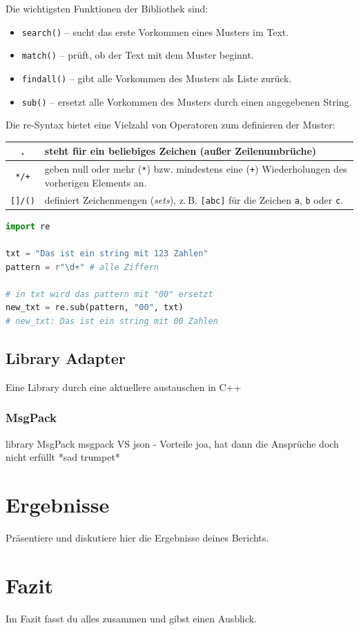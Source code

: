 \documentclass[a4paper, 12pt]{article}
\begin{document}
Die wichtigsten Funktionen der Bibliothek sind:
\begin{itemize}
    \item \texttt{search()} – sucht das erste Vorkommen eines Musters im Text.
    \item \texttt{match()} – prüft, ob der Text mit dem Muster beginnt.
    \item \texttt{findall()} – gibt alle Vorkommen des Musters als Liste zurück.
    \item \texttt{sub()} – ersetzt alle Vorkommen des Musters durch einen angegebenen String.
\end{itemize}

Die re-Syntax bietet eine Vielzahl von Operatoren zum definieren der Muster:
\begin{table}[h!]
\centering
\begin{tabular}{|c | >{\centering\arraybackslash}p{10cm}|}
\hline
\texttt{.} & steht für ein beliebiges Zeichen (außer Zeilenumbrüche) \\
\hline
\texttt{*/+} & geben null oder mehr (\texttt{*}) bzw. mindestens 
	eine (\texttt{+}) Wiederholungen des vorherigen Elements an. \\
\hline
\texttt{[]/()} & definiert Zeichenmengen (\textit{sets}), z.\,B. \texttt{[abc]} für die Zeichen 	 
	\texttt{a}, \texttt{b} oder \texttt{c}. \\
\hline
\end{tabular}
\end{table}

\begin{lstlisting}[language=Python, caption=Beispiel für Python-Code]
import re

txt = "Das ist ein string mit 123 Zahlen"
pattern = r"\d+" # alle Ziffern

# in txt wird das pattern mit "00" ersetzt
new_txt = re.sub(pattern, "00", txt)
# new_txt: Das ist ein string mit 00 Zahlen
\end{lstlisting} %

\subsection{Library Adapter}\label{LibraryAdapter}
Eine Library durch eine aktuellere austauschen in C++

\subsubsection{MsgPack}\label{msgpack}
library MsgPack
msgpack VS json - Vorteile
joa, hat dann die Ansprüche doch nicht erfüllt *sad trumpet*

\newpage
\section{Ergebnisse}
Präsentiere und diskutiere hier die Ergebnisse deines Berichts.

\newpage
\section{Fazit}
Im Fazit fasst du alles zusammen und gibst einen Ausblick.

\newpage


\end{document}

